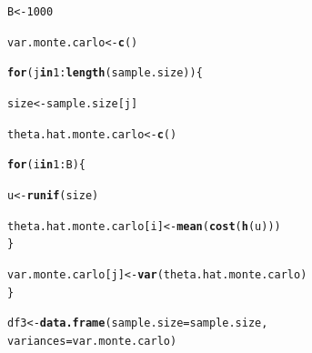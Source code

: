 \documentclass[11pt, a4paper]{article}\usepackage[]{graphicx}\usepackage[]{xcolor}
\makeatletter
\newcommand{\hlnum}[1]{\textcolor[rgb]{0.686,0.059,0.569}{#1}}%
\newcommand{\hlopt}[1]{\textcolor[rgb]{0,0,0}{#1}}%
\newcommand{\hldef}[1]{\textcolor[rgb]{0.345,0.345,0.345}{#1}}%
\newcommand{\hlkwa}[1]{\textcolor[rgb]{0.161,0.373,0.58}{\textbf{#1}}}%
\newcommand{\hlkwb}[1]{\textcolor[rgb]{0.69,0.353,0.396}{#1}}%
\newcommand{\hlkwc}[1]{\textcolor[rgb]{0.333,0.667,0.333}{#1}}%
\newcommand{\hlkwd}[1]{\textcolor[rgb]{0.737,0.353,0.396}{\textbf{#1}}}%
\newenvironment{kframe}{%
 \def\at@end@of@kframe{}%
 \ifinner\ifhmode%
  \def\at@end@of@kframe{\end{minipage}}%
  \begin{minipage}{\columnwidth}%
 \fi\fi%
 \def\FrameCommand##1{\hskip\@totalleftmargin \hskip-\fboxsep
 \colorbox{shadecolor}{##1}\hskip-\fboxsep
     \hskip-\linewidth \hskip-\@totalleftmargin \hskip\columnwidth}%
 \MakeFramed {\advance\hsize-\width
   \@totalleftmargin\z@ \linewidth\hsize
   \@setminipage}}%
 {\par\unskip\endMakeFramed%
 \at@end@of@kframe}
\newenvironment{knitrout}{}{} %
\makeatother
\begin{document}
\begin{enumerate}
\begin{knitrout}
\color{fgcolor}\begin{kframe}
\begin{alltt}
\hldef{B} \hlkwb{<-} \hlnum{1000}
\end{alltt}
\end{kframe}
\end{knitrout}

\begin{knitrout}
\color{fgcolor}\begin{kframe}
\begin{alltt}
\hldef{var.monte.carlo} \hlkwb{<-} \hlkwd{c}\hldef{()}

\hlkwa{for} \hldef{(j} \hlkwa{in} \hlnum{1}\hlopt{:}\hlkwd{length}\hldef{(sample.size)) \{}

  \hldef{size} \hlkwb{<-} \hldef{sample.size[j]}

  \hldef{theta.hat.monte.carlo} \hlkwb{<-} \hlkwd{c}\hldef{()}

  \hlkwa{for} \hldef{(i} \hlkwa{in} \hlnum{1}\hlopt{:}\hldef{B) \{}

    \hldef{u} \hlkwb{<-} \hlkwd{runif}\hldef{(size)}

    \hldef{theta.hat.monte.carlo[i]} \hlkwb{<-} \hlkwd{mean}\hldef{(}\hlkwd{cost}\hldef{(}\hlkwd{h}\hldef{(u)))}
  \hldef{\}}

  \hldef{var.monte.carlo[j]} \hlkwb{<-} \hlkwd{var}\hldef{(theta.hat.monte.carlo)}
\hldef{\}}
\end{alltt}
\end{kframe}
\end{knitrout}


\begin{knitrout}
\color{fgcolor}\begin{kframe}
\begin{alltt}
\hldef{df3} \hlkwb{<-} \hlkwd{data.frame}\hldef{(}\hlkwc{sample.size} \hldef{= sample.size,}
                  \hlkwc{variances} \hldef{= var.monte.carlo)}
\end{alltt}
\end{kframe}
\end{knitrout}



\end{enumerate}
\end{document}
